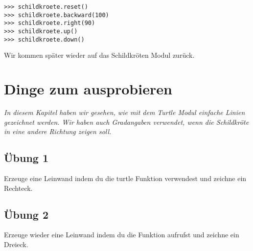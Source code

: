 \begin{listing}
\begin{verbatim}
>>> schildkroete.reset()
>>> schildkroete.backward(100)
>>> schildkroete.right(90)
>>> schildkroete.up()
>>> schildkroete.down()
\end{verbatim}
\end{listing}

\noindent
Wir kommen später wieder auf das Schildkröten Modul zurück.

\section{Dinge zum ausprobieren}

\emph{In diesem Kapitel haben wir gesehen, wie mit dem Turtle Modul einfache Linien gezeichnet werden. Wir haben auch Gradangaben verwendet, wenn die Schildkröte in eine andere Richtung zeigen soll.}

\subsection*{Übung 1}
Erzeuge eine Leinwand indem du die turtle Funktion  verwendest und zeichne ein Rechteck.

\subsection*{Übung 2}
Erzeuge wieder eine Leinwand indem du die Funktion  aufrufst und zeichne ein Dreieck.

\newpage
